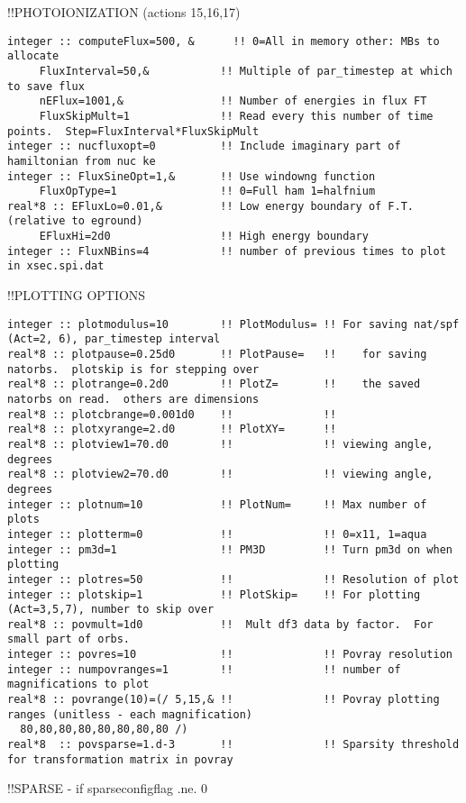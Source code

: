 !!{\large \quad PHOTOIONIZATION (actions 15,16,17)}
\begin{verbatim}
integer :: computeFlux=500, &      !! 0=All in memory other: MBs to allocate
     FluxInterval=50,&           !! Multiple of par_timestep at which to save flux
     nEFlux=1001,&               !! Number of energies in flux FT
     FluxSkipMult=1              !! Read every this number of time points.  Step=FluxInterval*FluxSkipMult
integer :: nucfluxopt=0          !! Include imaginary part of hamiltonian from nuc ke 
integer :: FluxSineOpt=1,&       !! Use windowng function
     FluxOpType=1                !! 0=Full ham 1=halfnium 
real*8 :: EFluxLo=0.01,&         !! Low energy boundary of F.T. (relative to eground)
     EFluxHi=2d0                 !! High energy boundary
integer :: FluxNBins=4           !! number of previous times to plot in xsec.spi.dat
\end{verbatim}
!!{\large \quad PLOTTING OPTIONS }
\begin{verbatim}
integer :: plotmodulus=10        !! PlotModulus= !! For saving nat/spf (Act=2, 6), par_timestep interval
real*8 :: plotpause=0.25d0       !! PlotPause=   !!    for saving natorbs.  plotskip is for stepping over
real*8 :: plotrange=0.2d0        !! PlotZ=       !!    the saved natorbs on read.  others are dimensions
real*8 :: plotcbrange=0.001d0    !!              !!    
real*8 :: plotxyrange=2.d0       !! PlotXY=      !!    
real*8 :: plotview1=70.d0        !!              !! viewing angle, degrees
real*8 :: plotview2=70.d0        !!              !! viewing angle, degrees
integer :: plotnum=10            !! PlotNum=     !! Max number of plots
integer :: plotterm=0            !!              !! 0=x11, 1=aqua
integer :: pm3d=1                !! PM3D         !! Turn pm3d on when plotting
integer :: plotres=50            !!              !! Resolution of plot
integer :: plotskip=1            !! PlotSkip=    !! For plotting (Act=3,5,7), number to skip over
real*8 :: povmult=1d0            !!  Mult df3 data by factor.  For small part of orbs.
integer :: povres=10             !!              !! Povray resolution
integer :: numpovranges=1        !!              !! number of magnifications to plot
real*8 :: povrange(10)=(/ 5,15,& !!              !! Povray plotting ranges (unitless - each magnification)
  80,80,80,80,80,80,80,80 /)
real*8  :: povsparse=1.d-3       !!              !! Sparsity threshold for transformation matrix in povray
\end{verbatim}
!!{\large \quad SPARSE - if sparseconfigflag .ne. 0}
